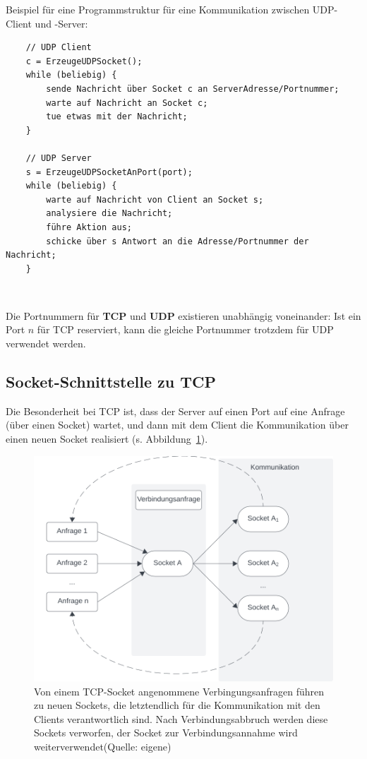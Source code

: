 Beispiel für eine Programmstruktur für eine Kommunikation zwischen UDP-Client und -Server:
\begin{verbatim}
    // UDP Client
    c = ErzeugeUDPSocket();
    while (beliebig) {
        sende Nachricht über Socket c an ServerAdresse/Portnummer;
        warte auf Nachricht an Socket c;
        tue etwas mit der Nachricht;
    }

    // UDP Server
    s = ErzeugeUDPSocketAnPort(port);
    while (beliebig) {
        warte auf Nachricht von Client an Socket s;
        analysiere die Nachricht;
        führe Aktion aus;
        schicke über s Antwort an die Adresse/Portnummer der Nachricht;
    }
\end{verbatim}\\


\begin{tcolorbox}
    Die Portnummern für \textbf{TCP} und \textbf{UDP} existieren unabhängig voneinander: Ist ein Port $n$ für TCP reserviert, kann die gleiche Portnummer trotzdem für UDP verwendet werden.
\end{tcolorbox}

\subsection{Socket-Schnittstelle zu TCP}

Die Besonderheit bei TCP ist, dass der Server auf einen Port auf eine Anfrage (über einen Socket) wartet, und dann mit dem Client die Kommunikation über einen neuen Socket realisiert (s. Abbildung~\ref{fig:tcpsockets}).\\

\begin{figure}
    \centering
    \includegraphics[scale=0.5]{chapters/fopt5/img/sockets/tcpsockets}
    \caption{Von einem TCP-Socket angenommene Verbingungsanfragen führen zu neuen Sockets, die letztendlich für die Kommunikation mit den Clients verantwortlich sind.
    Nach Verbindungsabbruch werden diese Sockets verworfen, der Socket zur Verbindungsannahme wird weiterverwendet(Quelle: eigene)}
    \label{fig:tcpsockets}
\end{figure}



